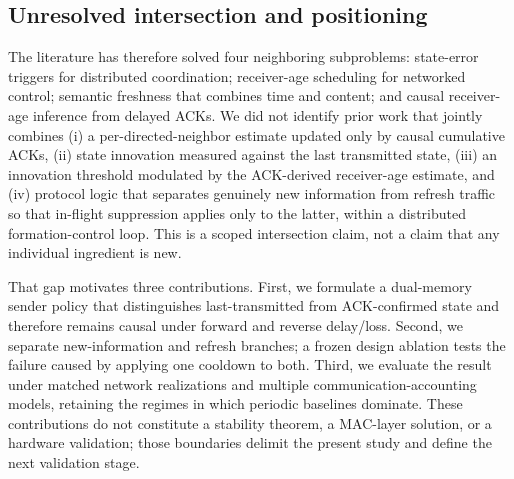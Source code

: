 \subsection{Unresolved intersection and positioning}

The literature has therefore solved four neighboring subproblems: state-error
triggers for distributed coordination; receiver-age scheduling for networked
control; semantic freshness that combines time and content; and causal
receiver-age inference from delayed ACKs. We did not identify prior work that
jointly combines (i) a per-directed-neighbor estimate updated only by causal
cumulative ACKs, (ii) state innovation measured against the last transmitted
state, (iii) an innovation threshold modulated by the ACK-derived receiver-age
estimate, and (iv) protocol logic that separates genuinely new information
from refresh traffic so that in-flight suppression applies only to the latter,
within a distributed formation-control loop. This is a scoped intersection
claim, not a claim that any individual ingredient is new.

That gap motivates three contributions. First, we formulate a dual-memory
sender policy that distinguishes last-transmitted from ACK-confirmed state and
therefore remains causal under forward and reverse delay/loss. Second, we
separate new-information and refresh branches; a frozen design ablation tests
the failure caused by applying one cooldown to both. Third, we evaluate the
result under matched network realizations and multiple communication-accounting
models, retaining the regimes in which periodic baselines dominate. These
contributions do not constitute a stability theorem, a MAC-layer solution, or
a hardware validation; those boundaries delimit the present study and define
the next validation stage.

